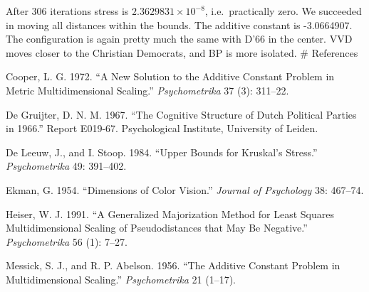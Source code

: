 \documentclass[
  12pt,
]{article}
\newlength{\cslhangindent}
\newenvironment{CSLReferences}[2] %
 {\begin{list}{}{%
  \setlength{\itemindent}{0pt}
  \setlength{\leftmargin}{0pt}
  \setlength{\parsep}{0pt}
  \ifodd #1
   \setlength{\leftmargin}{\cslhangindent}
   \setlength{\itemindent}{-1\cslhangindent}
  \fi
  \setlength{\itemsep}{#2\baselineskip}}}
 {\end{list}}
\begin{document}
After 306 iterations stress is \ensuremath{2.3629831\times 10^{-8}}, i.e.~practically zero. We succeeded in moving all distances within the bounds. The additive constant is -3.0664907. The configuration
is again pretty much the same with D'66 in the center. VVD moves closer to the Christian
Democrats, and BP is more isolated.
\# References

\label{refs}
\begin{CSLReferences}{1}{0}
Cooper, L. G. 1972. {``{A New Solution to the Additive Constant Problem in Metric Multidimensional Scaling}.''} \emph{Psychometrika} 37 (3): 311--22.

De Gruijter, D. N. M. 1967. {``{The Cognitive Structure of Dutch Political Parties in 1966}.''} Report E019-67. Psychological Institute, University of Leiden.

De Leeuw, J., and I. Stoop. 1984. {``Upper Bounds for Kruskal's Stress.''} \emph{Psychometrika} 49: 391--402.

Ekman, G. 1954. {``{Dimensions of Color Vision}.''} \emph{Journal of Psychology} 38: 467--74.

Heiser, W. J. 1991. {``{A Generalized Majorization Method for Least Squares Multidimensional Scaling of Pseudodistances that May Be Negative}.''} \emph{Psychometrika} 56 (1): 7--27.

Messick, S. J., and R. P. Abelson. 1956. {``{The Additive Constant Problem in Multidimensional Scaling}.''} \emph{Psychometrika} 21 (1--17).

\end{CSLReferences}
\end{document}
